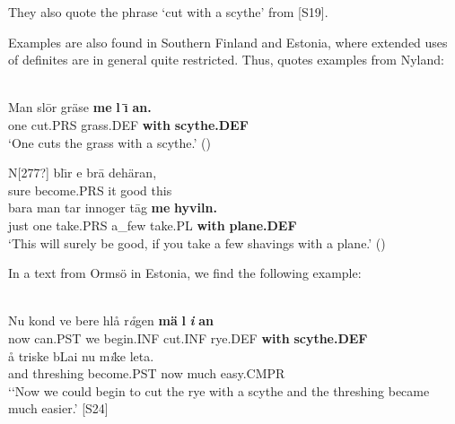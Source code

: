 \ea 
	\z 
\z

They also quote the phrase  ‘cut with a scythe’ from [S19]. 

Examples are also found in Southern Finland and Estonia, where extended uses of definites are in general quite restricted. Thus, \citet{Lundström1939} quotes examples from Nyland:

\ea\label{}
\\
\gll Man  sl\=or  gräse  \textbf{me} \textbf{l} \textbf{\={\i}} \textbf{an.}\\
one  cut.PRS  grass.DEF  \textbf{with} \textbf{scythe.DEF}\\
\glt ‘One cuts the grass with a scythe.’ (\citet[15]{Lundström1939})

\z

\ea
\gll N[277?]  bl\={\i}r  e  br\=a  dehäran,\\
sure  become.PRS  it  good  this\\
\gll bara  man  tar  innoger  t\=ag  \textbf{me} \textbf{hyviln.}\\
just  one  take.PRS  a\_few  take.PL  \textbf{with} \textbf{plane.DEF}\\
\glt ‘This will surely be good, if you take a few shavings with a plane.’ (\citet[15]{Lundström1939})

\z

In a text from Ormsö in Estonia, we find the following example:

\ea \label{} 
\\
\gll Nu  kond  ve  bere  hlå  r\textit{å}gen  \textbf{mä} \textbf{l} \textbf{\textit{i}} \textbf{an}\\
now  can.PST  we  begin.INF  cut.INF  rye.DEF  \textbf{with} \textbf{scythe.DEF}\\
\gll å  triske  bLai  nu  m\textit{i}ke  leta.\\
and  threshing  become.PST  now  much   easy.CMPR\\
\glt ‘‘Now we could begin to cut the rye with a scythe and the threshing became much easier.’ [S24]

